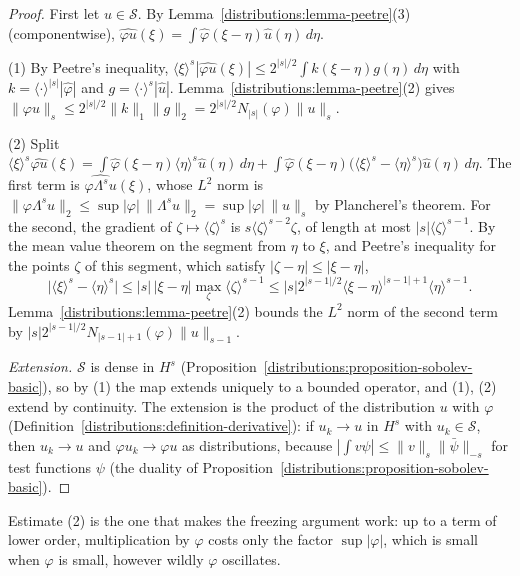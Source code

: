 \begin{proof}
First let $u \in \mathcal{S}$. By Lemma~\ref{distributions:lemma-peetre}(3) (componentwise), $\widehat{\varphi u}(\xi) = \int\hat\varphi(\xi - \eta)\hat u(\eta)\,d\eta$.

(1) By Peetre's inequality, $\langle\xi\rangle^s|\widehat{\varphi u}(\xi)| \leq 2^{|s|/2}\int k(\xi - \eta)g(\eta)\,d\eta$ with $k = \langle\cdot\rangle^{|s|}|\hat\varphi|$ and $g = \langle\cdot\rangle^s|\hat u|$. Lemma~\ref{distributions:lemma-peetre}(2)
gives $\|\varphi u\|_s \leq 2^{|s|/2}\|k\|_1\|g\|_2 = 2^{|s|/2}N_{|s|}(\varphi)\|u\|_s$.

(2) Split $\langle\xi\rangle^s\widehat{\varphi u}(\xi) = \int\hat\varphi(\xi - \eta)\langle\eta\rangle^s\hat u(\eta)\,d\eta + \int\hat\varphi(\xi - \eta)\bigl(\langle\xi\rangle^s - \langle\eta\rangle^s\bigr)\hat u(\eta)\,d\eta$. The first term is
$\widehat{\varphi\Lambda^su}(\xi)$, whose $L^2$ norm is $\|\varphi\Lambda^su\|_2 \leq \sup|\varphi|\,\|\Lambda^su\|_2 = \sup|\varphi|\,\|u\|_s$ by Plancherel's theorem. For the second, the gradient of $\zeta \mapsto \langle\zeta\rangle^s$ is
$s\langle\zeta\rangle^{s-2}\zeta$, of length at most $|s|\langle\zeta\rangle^{s-1}$. By the mean value theorem on the segment from $\eta$ to $\xi$, and Peetre's inequality for the points $\zeta$ of this segment,
which satisfy $|\zeta - \eta| \leq |\xi - \eta|$,
\[
\bigl|\langle\xi\rangle^s - \langle\eta\rangle^s\bigr| \leq |s|\,|\xi - \eta|\max_\zeta\langle\zeta\rangle^{s-1} \leq |s|2^{|s-1|/2}\langle\xi - \eta\rangle^{|s-1|+1}\langle\eta\rangle^{s-1} .
\]
Lemma~\ref{distributions:lemma-peetre}(2) bounds the $L^2$ norm of the second term by $|s|2^{|s-1|/2}N_{|s-1|+1}(\varphi)\|u\|_{s-1}$.

\emph{Extension.} $\mathcal{S}$ is dense in $H^s$ (Proposition~\ref{distributions:proposition-sobolev-basic}), so by (1) the map extends uniquely to a bounded operator, and (1), (2) extend by continuity. The
extension is the product of the distribution $u$ with $\varphi$ (Definition~\ref{distributions:definition-derivative}): if $u_k \to u$ in $H^s$ with $u_k \in \mathcal{S}$, then $u_k \to u$ and $\varphi u_k \to \varphi u$ as
distributions, because $|\int v\psi| \leq \|v\|_s\|\bar\psi\|_{-s}$ for test functions $\psi$ (the duality of Proposition~\ref{distributions:proposition-sobolev-basic}).
\end{proof}

Estimate (2) is the one that makes the freezing argument work: up to a term of lower order, multiplication by $\varphi$ costs only the factor $\sup|\varphi|$, which is small when $\varphi$ is small,
however wildly $\varphi$ oscillates.

